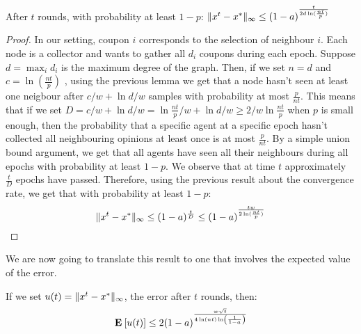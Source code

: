 \begin{theorem}
After $t$ rounds, with probability at least $1 - p$: $\| x^{t}-x^* \|_{\infty} \leq (1-a)^{\frac{t}{2d\ln( \frac{nt}{p})} }$
\end{theorem}
\begin{proof}
In our setting, coupon $i$ corresponds to the selection of neighbour $i$. Each node is a collector and wants to gather all $d_i$ coupons during each epoch. Suppose $d = \max_i d_i$ is the maximum degree of the graph. Then, if we set $n = d$ and $c = \ln (\frac{nt}{p})$ , using the previous lemma we get that a node hasn't seen at least one neigbour after $c/w + \ln d/w$ samples with probability at most $\frac{p}{nt}$. This means that if we set $D = c/w + \ln d/w =  \ln \frac{nt}{p}/w +  \ln d/w \geq 2/w\ln\frac{nt}{p} $ when $p$ is small enough, then the probability that a specific agent at a specific epoch hasn't collected all neighbouring opinions at least once is at most $\frac{p}{nt}$. By a simple union bound argument, we get that all agents have seen all their neighbours during all epochs with probability at least $1 - p$. We observe that at time $t$ approximately $\frac{t}{D}$ epochs have passed. Therefore, using the previous result about the convergence rate, we get that with probability at least $1 - p$:
$$ \| x^{t}-x^* \|_{\infty} \leq (1-a)^{\frac{t}{D}} \leq (1-a)^{\frac{tw}{2\ln( \frac{nt}{p})} }$$

\end{proof}
We are now going to translate this result to one that involves the expected value of the error. 
\begin{theorem}If we set $u(t) = \| x^t-x^* \|_{\infty}$, the error after $t$ rounds, then:
$$
\Exp{u(t)} \leq 2(1-a)^{\frac{w\sqrt{t}}{4\ln(nt)\ln\lp( \frac{1}{1-a}\rp)}}
$$
\end{theorem}
